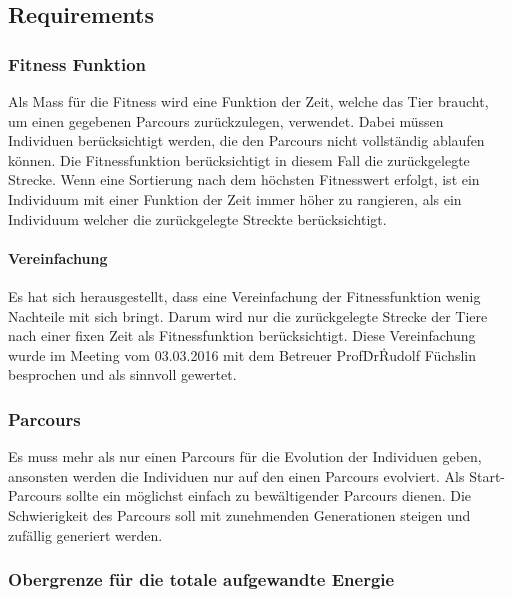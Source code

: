   \subsection{Requirements}

    \subsubsection{Fitness Funktion}

      Als Mass für die Fitness wird eine Funktion der Zeit, welche das Tier braucht,
      um einen gegebenen Parcours zurückzulegen, verwendet.
      Dabei müssen Individuen berücksichtigt werden,
      die den Parcours nicht vollständig ablaufen können.
      Die Fitnessfunktion berücksichtigt in diesem Fall die zurückgelegte Strecke.
      Wenn eine Sortierung nach dem höchsten Fitnesswert erfolgt,
      ist ein Individuum mit einer Funktion der Zeit immer höher zu rangieren,
      als ein Individuum welcher die zurückgelegte Streckte berücksichtigt.

      \paragraph{Vereinfachung}

        Es hat sich herausgestellt, dass eine Vereinfachung der Fitnessfunktion wenig Nachteile mit sich bringt.
        Darum wird nur die zurückgelegte Strecke der Tiere nach einer fixen Zeit als Fitnessfunktion berücksichtigt.
        Diese Vereinfachung wurde im Meeting vom 03.03.2016 mit dem Betreuer Prof\. Dr\. Rudolf Füchslin besprochen
        und als sinnvoll gewertet.

    \subsubsection{Parcours}

      Es muss mehr als nur einen Parcours für die Evolution der Individuen geben,
      ansonsten werden die Individuen nur auf den einen Parcours evolviert.
      Als Start-Parcours sollte ein möglichst einfach zu bewältigender Parcours dienen.
      Die Schwierigkeit des Parcours soll mit zunehmenden Generationen steigen und zufällig generiert werden.

    \subsubsection{Obergrenze für die totale aufgewandte Energie}

